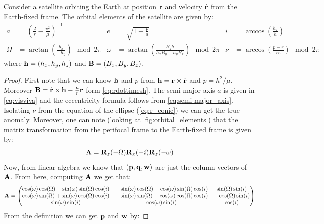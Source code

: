 \documentclass[../main.tex]{subfiles}
\begin{document}
\begin{theorem}
  Consider a satellite orbiting the Earth at position $\boldsymbol{\mathrm{r}}$ and velocity $\dot{\boldsymbol{\mathrm{r}}}$ from the Earth-fixed frame. The orbital elements of the satellite are given by:
  \begin{align*}
    a      & = {\left(\frac{2}{r}-\frac{v^2}{\mu}\right)}^{-1} & e      & = \sqrt{1-\frac{p}{a}}                                   & i   & = \arccos\left(\frac{h_z}{h}\right)          \\
    \Omega & = \arctan\left(\frac{h_x}{-h_y}\right)\mod 2\pi   & \omega & =\arctan\left(\frac{B_zh}{h_xB_y-h_yB_x}\right)\mod 2\pi & \nu & =\arccos\left(\frac{p-r}{re}\right)\mod 2\pi
  \end{align*}
  where $\boldsymbol{\mathrm{h}}=(h_x,h_y,h_z)$ and $\boldsymbol{\mathrm{B}}= (B_x,B_y,B_z)$.
\end{theorem}
\begin{proof}
  First note that we can know $\boldsymbol{\mathrm{h}}$ and $p$ from $\boldsymbol{\mathrm{h}}=\boldsymbol{\mathrm{r}}\times \dot{\boldsymbol{\mathrm{r}}}$ and $p=h^2/\mu$. Moreover $\boldsymbol{\mathrm{B}}=\dot{\boldsymbol{\mathrm{r}}}\times \boldsymbol{\mathrm{h}}-\frac{\mu}{r}\boldsymbol{\mathrm{r}}$ form \cref{eq:rdottimesh}. The semi-major axis $a$ is given in \cref{eq:visviva} and the eccentricity formula follows from \cref{eq:semi-major_axis}. Isolating $\nu$ from the equation of the ellipse (\cref{eq:r_conic}) we can get the true anomaly. Moreover, one can note (looking at \cref{fig:orbital_elements}) that the matrix transformation from the perifocal frame to the Earth-fixed frame is given by:
  \begin{equation}
    \boldsymbol{\mathrm{A}}=\boldsymbol{\mathrm{R}}_z(-\Omega)\boldsymbol{\mathrm{R}}_x(-i)\boldsymbol{\mathrm{R}}_z(-\omega)
  \end{equation}
  Now, from linear algebra we know that $(\boldsymbol{\mathrm{p}}, \boldsymbol{\mathrm{q}}, \boldsymbol{\mathrm{w}})$ are just the column vectors of $\boldsymbol{\mathrm{A}}$. From here, computing $\boldsymbol{\mathrm{A}}$ we get that:
  \begin{equation}
    \boldsymbol{\mathrm{A}}= \begin{pmatrix}
      \cos(\omega)\cos(\Omega)-\sin(\omega)\sin(\Omega)\cos(i) & -\sin(\omega)\cos(\Omega)-\cos(\omega)\sin(\Omega)\cos(i) & \sin(\Omega)\sin(i)  \\
      \cos(\omega)\sin(\Omega)+\sin(\omega)\cos(\Omega)\cos(i) & -\sin(\omega)\sin(\Omega)+\cos(\omega)\cos(\Omega)\cos(i) & -\cos(\Omega)\sin(i) \\
      \sin(\omega)\sin(i)                                      & \cos(\omega)\sin(i)                                       & \cos(i)
    \end{pmatrix}
  \end{equation}
  From the definition we can get $\boldsymbol{\mathrm{p}}$ and $\boldsymbol{\mathrm{w}}$ by:

\end{proof}
\end{document}
